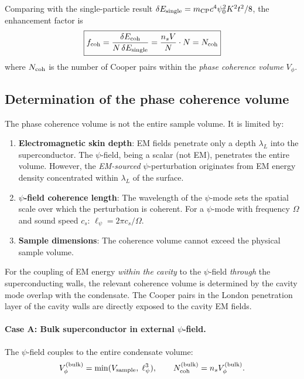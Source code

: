\documentclass[12pt,aps,prd,twocolumn,superscriptaddress,nofootinbib]{revtex4-2}
\begin{document}
Comparing with the single-particle result $\delta E_{\rm single}
= m_{\rm CP}c^4\psi_0^2 K^2 t^2/8$, the enhancement factor is
\begin{equation}\label{eq:enhancement-factor}
\boxed{
f_{\rm coh} = \frac{\delta E_{\rm coh}}{N\,\delta E_{\rm single}}
= \frac{n_s V}{N} \cdot N = N_{\rm coh}
}
\end{equation}
where $N_{\rm coh}$ is the number of Cooper pairs within the
\emph{phase coherence volume} $V_\phi$.

\subsection{Determination of the phase coherence volume}
\label{sec:coherence-volume}

The phase coherence volume is not the entire sample volume. It is
limited by:

\begin{enumerate}
\item \textbf{Electromagnetic skin depth}: EM fields penetrate only
a depth $\lambda_L$ into the superconductor. The $\psi$-field,
being a scalar (not EM), penetrates the entire volume. However, the
\emph{EM-sourced} $\psi$-perturbation originates from EM energy density
concentrated within $\lambda_L$ of the surface.

\item \textbf{$\psi$-field coherence length}: The wavelength of the
$\psi$-mode sets the spatial scale over which the perturbation is
coherent. For a $\psi$-mode with frequency $\Omega$ and sound speed
$c_s$: $\ell_\psi = 2\pi c_s/\Omega$.

\item \textbf{Sample dimensions}: The coherence volume cannot exceed
the physical sample volume.
\end{enumerate}

For the coupling of EM energy \emph{within the cavity} to the
$\psi$-field \emph{through} the superconducting walls, the relevant
coherence volume is determined by the cavity mode overlap with the
condensate. The Cooper pairs in the London penetration layer of the
cavity walls are directly exposed to the cavity EM fields.

\paragraph{Case A: Bulk superconductor in external $\psi$-field.}
The $\psi$-field couples to the entire condensate volume:
\begin{equation}\label{eq:Vcoh-bulk}
V_\phi^{(\rm bulk)} = \min(V_{\rm sample},\;\ell_\psi^3),
\qquad
N_{\rm coh}^{(\rm bulk)} = n_s V_\phi^{(\rm bulk)}.
\end{equation}
\end{document}
